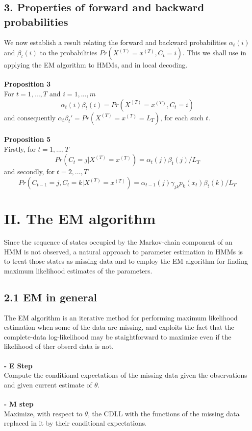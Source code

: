\documentclass{article}
\begin{document}
\subsection*{3. Properties of forward and backward probabilities}

We now establish a result relating the forward and backward probabilities $\alpha_t(i)$ and $\beta_t(i)$ to the probabilities $Pr(X^{(T)} = x^{(T)}, C_t = i)$. This we shall use in applying the EM algorithm to HMMs, and in local decoding. \\
\\
\textbf{Proposition 3} \\
For $t = 1, ..., T$ and $i = 1, ..., m$
$$\alpha_t(i) \beta_t(i) = Pr(X^{(T)} = x^{(T)}, C_t = i)$$
and consequently $\alpha_t \beta_t' = Pr(X^{(T)} = x^{(T)} = L_T)$, for each such $t$. \\
\\
\textbf{Proposition 5} \\
Firstly, for $t = 1, ..., T$
$$Pr(C_t = j | X^{(T)} = x^{(T)}) = \alpha_t(j) \beta_t(j) / L_T$$
and secondly, for $t = 2, ..., T$
$$Pr(C_{t-1} = j, C_t = k | X^{(T)} = x^{(T)}) = \alpha_{t-1}(j) \gamma_{jk} p_k(x_t) \beta_t(k) / L_T$$

\section*{II. The EM algorithm}

Since the sequence of states occupied by the Markov-chain component of an HMM is not observed, a natural approach to parameter estimation in HMMs is to treat those states as missing data and to employ the EM algorithm for finding maximum likelihood estimates of the parameters. 

\subsection*{2.1 EM in general}
The EM algorithm is an iterative method for performing maximum likelihood estimation when some of the data are missing, and exploits the fact that the complete-data log-likelihood may be staightforward to maximize even if the likelihood of ther obserd data is not. \\
\\
\textbf{- E Step} \\
Compute the conditional expectations of the missing data given the observations and given current estimate of $\theta$. \\
\\
\textbf{- M step} \\
Maximize, with respect to $\theta$, the CDLL with the functions of the missing data replaced in it by their conditional expectations. \\
\end{document}
